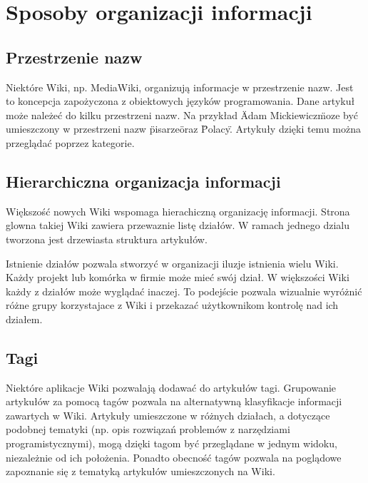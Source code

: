\documentclass{article}
\begin{document}
\newpage
\section{Sposoby organizacji informacji}	
	\subsection{Przestrzenie nazw}
	

	Niektóre Wiki, np. MediaWiki, organizują informacje w przestrzenie nazw. Jest to koncepcja zapożyczona z obiektowych języków programowania. Dane artykuł może należeć do kilku przestrzeni nazw. Na przykład \"Adam Mickiewicz\" moze być umieszczony w przestrzeni nazw \"pisarze\" oraz \"Polacy\". Artykuły dzięki temu można przeglądać poprzez kategorie.   
 
\subsection{Hierarchiczna organizacja informacji}
Większość nowych Wiki wspomaga hierachiczną organizację informacji. Strona glowna takiej Wiki zawiera przewaznie listę działów. W ramach jednego dzialu tworzona jest drzewiasta struktura artykułów.  

	Istnienie działów pozwala stworzyć w organizacji iluzje istnienia wielu Wiki. Każdy projekt lub komórka w firmie może mieć swój dział. W większości Wiki każdy z działów może wyglądać inaczej. To podejście pozwala wizualnie wyróżnić różne grupy korzystajace z Wiki i przekazać użytkownikom kontrolę nad ich działem.




\subsection{Tagi}

	Niektóre aplikacje Wiki pozwalają dodawać do artykułów tagi. Grupowanie artykułów za pomocą tagów pozwala    na alternatywną klasyfikacje informacji zawartych w Wiki. Artykuły umieszczone w różnych działach, a dotyczące podobnej tematyki (np. opis rozwiązań problemów z narzędziami programistycznymi), mogą dzięki tagom być   przeglądane  w jednym widoku, niezależnie od ich położenia.
Ponadto obecność tagów pozwala na poglądowe zapoznanie się z tematyką artykułów umieszczonych na Wiki.

\end{document}

